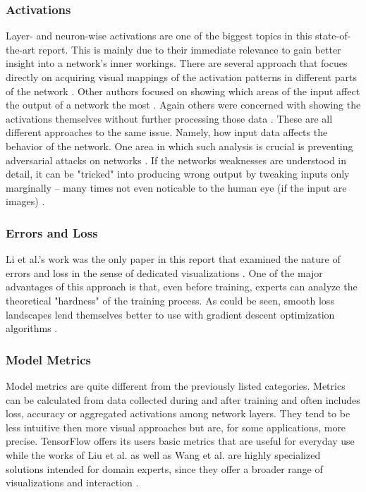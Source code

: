 \documentclass{acmsiggraph}               %
\begin{document}
\subsubsection{Activations}
Layer- and neuron-wise activations are one of the biggest topics in this state-of-the-art report. This is mainly due to their immediate relevance to gain better insight into a network's inner workings.
There are several approach that focues directly on acquiring visual mappings of the activation patterns in different parts of the network \cite{Yosinski2015,Nguyen2016}. Other authors focused on showing which areas of the input affect the output of a network the most \cite{Samek2017}. Again others were concerned with showing the activations themselves without further processing those data \cite{Liu2018}. These are all different approaches to the same issue. Namely, how input data affects the behavior of the network. One area in which such analysis is crucial is preventing adversarial attacks on networks \cite{Hohman2018}. If the networks weaknesses are understood in detail, it can be "tricked" into producing wrong output by tweaking inputs only marginally -- many times not even noticable to the human eye (if the input are images) \cite{Hohman2018}.
\subsubsection{Errors and Loss}
Li et al.'s work was the only paper in this report that examined the nature of errors and loss in the sense of dedicated visualizations \cite{Li2017}. One of the major advantages of this approach is that, even before training, experts can analyze the theoretical "hardness" of the training process. As could be seen, smooth loss landscapes lend themselves better to use with gradient descent optimization algorithms \cite{Li2017}.
\subsubsection{Model Metrics}
Model metrics are quite different from the previously listed categories. Metrics can be calculated from data collected during and after training and often includes loss, accuracy or aggregated activations among network layers. They tend to be less intuitive then more visual approaches but are, for some applications, more precise. TensorFlow \cite{Wongsuphasawat2018} offers its users basic metrics that are useful for everyday use while the works of Liu et al. as well as Wang et al. are highly specialized solutions intended for domain experts, since they offer a broader range of visualizations and interaction \cite{Liu2016,Liu2018,Wang}.
\end{document}
